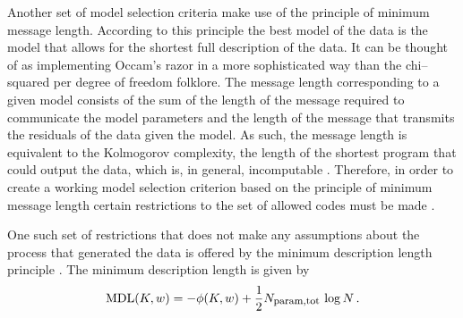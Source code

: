 Another set of model selection criteria make use of the principle of
minimum message length. According to this principle the best model of
the data is the model that allows for the shortest full description of
the data. It can be thought of as implementing Occam's razor in a more
sophisticated way than the chi--squared per degree of freedom
folklore. The message length corresponding to a given model consists
of the sum of the length of the message required to communicate the
model parameters and the length of the message that transmits the
residuals of the data given the model. As such, the message length is
equivalent to the Kolmogorov complexity, the length of the shortest
program that could output the data, which is, in general, incomputable
\citep{solomonoff64a,solomonoff64b,kolmogorov65a}. Therefore, in order
to create a working model selection criterion based on the principle
of minimum message length certain restrictions to the set of allowed
codes must be made \citep{Wallace99a}.

One such set of restrictions that does not make any assumptions about
the process that generated the data is offered by the minimum
description length principle \citep{rissanen78a,Grunwaldbook}. The
minimum description length is given by \citep{rissanen78a,schwarz78a}
\begin{equation}\label{eq:mdl}
\mathrm{MDL}(K,w) = -\phi(K,w)+\frac{1}{2}N_{\mbox{{\footnotesize param,tot}}}\,\log N\, .
\end{equation}

